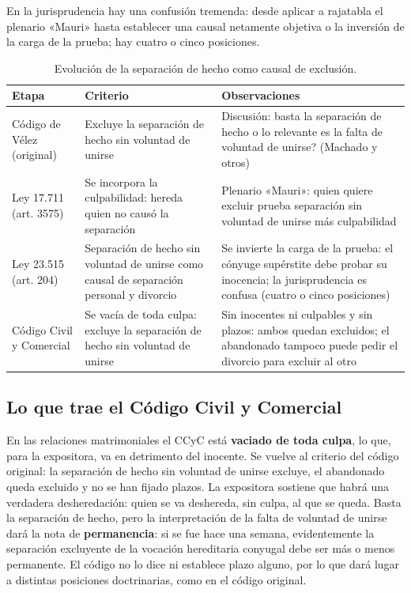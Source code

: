 \documentclass[12pt,oneside]{book}
\begin{document}
En la jurisprudencia hay una confusión tremenda: desde aplicar a rajatabla el plenario «Mauri» hasta establecer una causal netamente objetiva o la inversión de la carga de la prueba; hay cuatro o cinco posiciones.

\begin{table}[H]
\centering
\small
\begin{tabularx}{\textwidth}{
    >{\raggedright\arraybackslash}p{3cm}
    >{\raggedright\arraybackslash}X
    >{\raggedright\arraybackslash}X
}
\toprule
\textbf{Etapa} & \textbf{Criterio} & \textbf{Observaciones} \\
\midrule
Código de Vélez (original) & Excluye la separación de hecho sin voluntad de unirse & Discusión: \textquestiondown{}basta la separación de hecho o lo relevante es la falta de voluntad de unirse? (Machado y otros) \\
\addlinespace
Ley 17.711 (art. 3575) & Se incorpora la culpabilidad: hereda quien no causó la separación & Plenario «Mauri»: quien quiere excluir prueba separación sin voluntad de unirse más culpabilidad \\
\addlinespace
Ley 23.515 (art. 204) & Separación de hecho sin voluntad de unirse como causal de separación personal y divorcio & Se invierte la carga de la prueba: el cónyuge supérstite debe probar su inocencia; la jurisprudencia es confusa (cuatro o cinco posiciones) \\
\addlinespace
Código Civil y Comercial & Se vacía de toda culpa: excluye la separación de hecho sin voluntad de unirse & Sin inocentes ni culpables y sin plazos: ambos quedan excluidos; el abandonado tampoco puede pedir el divorcio para excluir al otro \\
\bottomrule
\end{tabularx}
\caption*{Evolución de la separación de hecho como causal de exclusión.}
\end{table}

\subsection{Lo que trae el Código Civil y Comercial}

En las relaciones matrimoniales el CCyC está \textbf{vaciado de toda culpa}, lo que, para la expositora, va en detrimento del inocente. Se vuelve al criterio del código original: la separación de hecho sin voluntad de unirse excluye, el abandonado queda excluido y no se han fijado plazos. La expositora sostiene que habrá una verdadera desheredación: quien se va deshereda, sin culpa, al que se queda. Basta la separación de hecho, pero la interpretación de la falta de voluntad de unirse dará la nota de \textbf{permanencia}: si se fue hace una semana, evidentemente la separación excluyente de la vocación hereditaria conyugal debe ser más o menos permanente. El código no lo dice ni establece plazo alguno, por lo que dará lugar a distintas posiciones doctrinarias, como en el código original.
\end{document}
